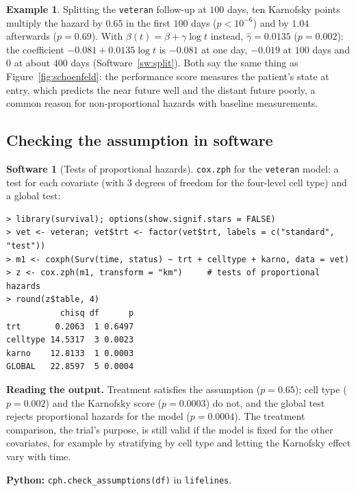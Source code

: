 \documentclass[11pt,a4paper]{article}
\numberwithin{equation}{section}
\theoremstyle{definition}
\newtheorem{exa}[thm]{Example}
\newtheorem{software}[thm]{Software}
\begin{document}
\begin{exa}
\label{ex:split}
Splitting the \texttt{veteran} follow-up at $100$ days, ten Karnofsky points multiply the hazard by $0.65$ in the first $100$ days ($p < 10^{-6}$) and by $1.04$ afterwards ($p = 0.69$). With $\beta(t) = \beta + \gamma\log t$ instead, $\hat\gamma = 0.0135$ ($p = 0.002$): the coefficient $-0.081 + 0.0135\log t$ is $-0.081$ at one day, $-0.019$ at $100$ days and
$0$ at about $400$ days (Software~\ref{sw:split}). Both say the same thing as Figure~\ref{fig:schoenfeld}: the performance score measures the patient's state at entry, which predicts the near future well and the distant future poorly, a common reason for non-proportional hazards with baseline measurements.
\end{exa}

\subsection{Checking the assumption in software}
\label{ssec:software9}

\begin{software}[Tests of proportional hazards]
\label{sw:zph}
\texttt{cox.zph} for the \texttt{veteran} model: a test for each covariate (with $3$ degrees of freedom for the four-level cell type) and a global test:
{\small\begin{verbatim}
> library(survival); options(show.signif.stars = FALSE)
> vet <- veteran; vet$trt <- factor(vet$trt, labels = c("standard", "test"))
> m1 <- coxph(Surv(time, status) ~ trt + celltype + karno, data = vet)
> z <- cox.zph(m1, transform = "km")     # tests of proportional hazards
> round(z$table, 4)
           chisq df      p
trt       0.2063  1 0.6497
celltype 14.5317  3 0.0023
karno    12.8133  1 0.0003
GLOBAL   22.8597  5 0.0004
\end{verbatim}}
\textbf{Reading the output.} Treatment satisfies the assumption ($p = 0.65$); cell type ($p = 0.002$) and the Karnofsky score ($p = 0.0003$) do not, and the global test rejects proportional hazards for the model ($p = 0.0004$). The treatment comparison, the trial's purpose, is still valid if the model is fixed for the other covariates, for example by stratifying by cell type and letting the
Karnofsky effect vary with time.

\textbf{Python:} \texttt{cph.check\_assumptions(df)} in \texttt{lifelines}.
\end{software}
\end{document}
